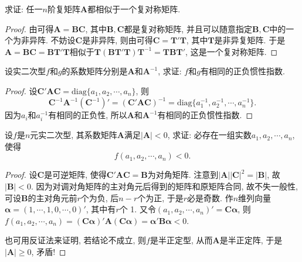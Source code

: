 \documentclass[../../main.tex]{subfiles}%
\begin{document}
\begin{proposition}
求证: 任一$n$阶复矩阵$\boldsymbol{A}$都相似于一个复对称矩阵.
\end{proposition}
\begin{proof}
由可得$\boldsymbol{A}=\boldsymbol{B}\boldsymbol{C}$, 其中$\boldsymbol{B}, \boldsymbol{C}$都是复对称矩阵, 并且可以随意指定$\boldsymbol{B}, \boldsymbol{C}$中的一个为非异阵. 不妨设$\boldsymbol{C}$是非异阵, 则由可得$\boldsymbol{C}=\boldsymbol{T}'\boldsymbol{T}$, 其中$\boldsymbol{T}$是非异复矩阵. 于是$\boldsymbol{A}=\boldsymbol{B}\boldsymbol{C}=\boldsymbol{B}\boldsymbol{T}'\boldsymbol{T}$相似于$\boldsymbol{T}(\boldsymbol{B}\boldsymbol{T}'\boldsymbol{T})\boldsymbol{T}^{-1}=\boldsymbol{T}\boldsymbol{B}\boldsymbol{T}'$, 这是一个复对称矩阵. 
\end{proof}

\begin{proposition}\label{proposition:实对称阵和逆的二次型有相同的正负惯性指数}
设实二次型$f$和$g$的系数矩阵分别是$\boldsymbol{A}$和$\boldsymbol{A}^{-1}$, 求证: $f$和$g$有相同的正负惯性指数.
\end{proposition}
\begin{proof}
设$\boldsymbol{C}'\boldsymbol{A}\boldsymbol{C}=\text{diag}\{a_1, a_2, \cdots, a_n\}$, 则
\[
\boldsymbol{C}^{-1}\boldsymbol{A}^{-1}(\boldsymbol{C}^{-1})'=(\boldsymbol{C}'\boldsymbol{A}\boldsymbol{C})^{-1}=\text{diag}\{a_1^{-1}, a_2^{-1}, \cdots, a_n^{-1}\}.
\]
因为$a_i$和$a_i^{-1}$有相同的正负性, 所以$\boldsymbol{A}$和$\boldsymbol{A}^{-1}$有相同的正负惯性指数.
\end{proof}

\begin{proposition}\label{proposition:系数阵的行列式小于零的二次型必存在小于零的一点}
设$f$是$n$元实二次型, 其系数矩阵$\boldsymbol{A}$满足$|\boldsymbol{A}|<0$, 求证: 必存在一组实数$a_1, a_2, \cdots, a_n$, 使得
\[
f(a_1, a_2, \cdots, a_n)<0.
\]
\end{proposition}
\begin{proof}
设$\boldsymbol{C}$是可逆矩阵, 使得$\boldsymbol{C}'\boldsymbol{A}\boldsymbol{C}=\boldsymbol{B}$为对角矩阵. 注意到$|\boldsymbol{A}||\boldsymbol{C}|^2 = |\boldsymbol{B}|$, 故$|\boldsymbol{B}|<0$. 因为对调对角矩阵的主对角元后得到的矩阵和原矩阵合同, 故不失一般性, 可设$\boldsymbol{B}$的主对角元前$r$个为负, 后$n - r$个为正, 于是$r$必是奇数. 作$n$维列向量$\boldsymbol{\alpha}=(1, \cdots, 1, 0, \cdots, 0)'$, 其中有$r$个 1. 又令$(a_1, a_2, \cdots, a_n)'=\boldsymbol{C}\boldsymbol{\alpha}$, 则$f(a_1, a_2, \cdots, a_n)=(\boldsymbol{C}\boldsymbol{\alpha})'\boldsymbol{A}(\boldsymbol{C}\boldsymbol{\alpha})=\boldsymbol{\alpha}'\boldsymbol{B}\boldsymbol{\alpha}<0$. 

也可用反证法来证明, 若结论不成立, 则$f$是半正定型, 从而$\boldsymbol{A}$是半正定阵, 于是$|\boldsymbol{A}|\geqslant  0$, 矛盾!
\end{proof}
\end{document}
